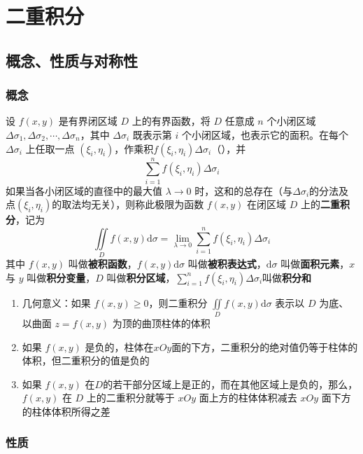 \documentclass[../book.tex]{subfiles}
\begin{document}
    \section{二重积分}

    \subsection{概念、性质与对称性}

    \subsubsection{概念}

    设 $f(x,y)$ 是有界闭区域 $D$ 上的有界函数，将 $D$ 任意{\color{red}{分割}}成 $n$ 个小闭区域 $\Delta\sigma_1, \Delta\sigma_2, \cdots, \Delta\sigma_n$，其中 $\Delta\sigma_i$ 既表示第 $i$ 个小闭区域，也表示它的面积。在每个 $\Delta\sigma_i$ 上任取一点 $(\xi_i, \eta_i)$，作乘积$f(\xi_i, \eta_i) \Delta\sigma_i$（{\color{red}{近似}}），并{\color{red}{作和}}
    \[
        \sum_{i=1}^{n} f(\xi_i, \eta_i) \Delta\sigma_i
    \]
    如果当各小闭区域的直径中的最大值 $\lambda \to 0$ 时，这和的{\color{red}{极限}}总存在（与$\Delta\sigma_i$的分法及点$(\xi_i, \eta_i)$的取法均无关），则称此极限为函数 $f(x,y)$ 在闭区域 $D$ 上的\textbf{二重积分}，记为
    \[
        \iint\limits_D f(x,y) \mathrm{d}\sigma = \lim_{\lambda \to 0} \sum_{i=1}^{n} f(\xi_i, \eta_i) \Delta\sigma_i
    \]
    其中 $f(x,y)$ 叫做\textbf{被积函数}，$f(x,y)\mathrm{d}\sigma$ 叫做\textbf{被积表达式}，$\mathrm{d}\sigma$ 叫做\textbf{面积元素}，$x$ 与 $y$ 叫做\textbf{积分变量}，$D$ 叫做\textbf{积分区域}，$\sum\limits_{i=1}^{n} f(\xi_i, \eta_i) \Delta\sigma_i$叫做\textbf{积分和}

    \begin{enumerate}
        \item 几何意义：如果 $f(x,y) \geq 0$，则二重积分 $\displaystyle\iint\limits_D f(x,y) \mathrm{d}\sigma$ 表示以 $D$ 为底、以曲面 $z = f(x,y)$ 为顶的曲顶柱体的体积
        \item 如果 $f(x, y)$ 是负的，柱体在$xOy$面的下方，二重积分的绝对值仍等于柱体的体积，但二重积分的值是负的
        \item 如果 $f(x, y)$ 在$D$的若干部分区域上是正的，而在其他区域上是负的，那么，$f(x, y)$ 在 $D$ 上的二重积分就等于 $xOy$ 面上方的柱体体积减去 $xOy$ 面下方的柱体体积所得之差
    \end{enumerate}

    \subsubsection{性质}
\end{document}
